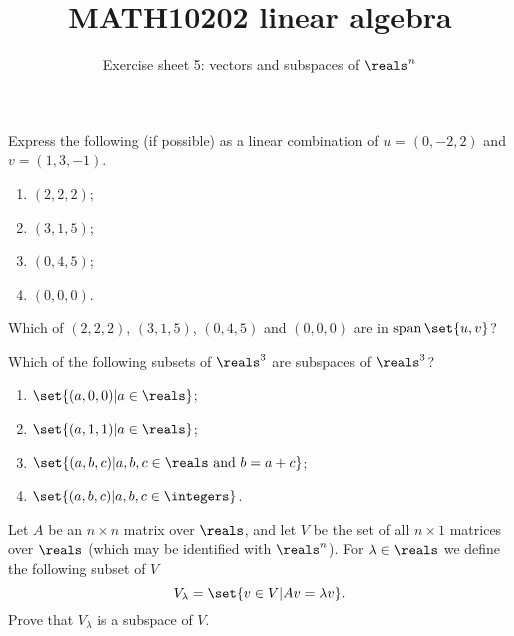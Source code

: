 \documentclass[english,12pt,a4paper]{scrartcl}
\title{MATH10202 linear algebra}
\subtitle{Exercise sheet 5: vectors and subspaces of $\reals^n$}
\author{}
\date{\vspace{-5ex}}
\newenvironment{modenumerate}
  {\enumerate\setupmodenumerate}
  {\endenumerate}
\newif\ifmoditem
\newcommand{\setupmodenumerate}{%
  \global\moditemfalse
  \let\origmakelabel\makelabel
  \def\moditem##1{\global\moditemtrue\def\mesymbol{##1}\item}%
  \def\makelabel##1{%
  \origmakelabel{##1\ifmoditem\rlap{\mesymbol}\fi\enspace}%
\global\moditemfalse}%
}
\DeclareMathOperator{\spn}{span}
\newcommand\spanset[1]{\ensuremath{\spn\set{#1}}}
\begin{document}
\maketitle

\begin{modenumerate}
  \moditem{*} Express the following (if possible) as a linear combination of $u 
  = (0, -2, 2)$ and $v = (1, 3, -1)$.
  \begin{multicols}{4}
    \begin{enumerate}
      \item $(2, 2, 2)$;
      \item $(3, 1, 5)$;
      \item $(0, 4, 5)$;
      \item $(0, 0, 0)$.
    \end{enumerate}
  \end{multicols}
  Which of $(2, 2, 2)$, $(3, 1, 5)$, $(0, 4, 5)$ and $(0, 0, 0)$ are in 
  $\spanset{u, v}$?
  \moditem{*} Which of the following subsets of $\reals^3$ are subspaces of 
  $\reals^3$?
  \begin{multicols}{2}
    \begin{enumerate}
      \item $\set{(a, 0, 0) | a \in \reals}$;
      \item $\set{(a, 1, 1) | a \in \reals}$;
      \item $\set{(a, b, c) | a, b, c \in \reals \text{ and } b = a + c}$;
      \item $\set{(a, b, c) | a, b, c \in \integers}$.
    \end{enumerate}
  \end{multicols}
  \moditem{*} Let $A$ be an $n \times n$ matrix over $\reals$, and let $V$ be 
  the set of all $n \times 1$ matrices over $\reals$ (which may be identified 
  with $\reals^n$). For $\lambda \in \reals$ we define the following subset of 
  $V$
  \[
    V_\lambda = \set{v \in V | Av = \lambda v}.
  \]
  Prove that $V_\lambda$ is a subspace of $V$.
  

\end{modenumerate}
\end{document}
